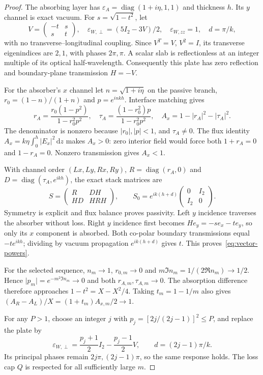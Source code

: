 \documentclass[11pt,a4paper]{article}
\theoremstyle{remark}
\newcommand{\abs}[1]{\lvert #1\rvert}
\newcommand{\dd}{\,\mathrm d}
\newcommand{\diag}{\operatorname{diag}}
\begin{document}
\begin{proof}
The absorbing layer has $\varepsilon_A=\diag(1+i\eta,1,1)$ and thickness $h$. Its $y$ channel is exact vacuum. For $s=\sqrt{1-t^2}$, let
\[
 V=\begin{pmatrix}-t&s\\s&t\end{pmatrix},\quad
 \varepsilon_{W,\perp}=(5I_2-3V)/2,\quad\varepsilon_{W,zz}=1,\quad d=\pi/k,
\]
with no transverse--longitudinal coupling. Since $V^T=V$, $V^2=I$, its transverse eigenindices are $2,1$, with phases $2\pi,\pi$. A scalar slab is reflectionless at an integer multiple of its optical half-wavelength. Consequently this plate has zero reflection and boundary-plane transmission $H=-V$.

For the absorber's $x$ channel let $n=\sqrt{1+i\eta}$ on the passive branch, $r_0=(1-n)/(1+n)$ and $p=e^{inkh}$. Interface matching gives
\[
 r_A=\frac{r_0(1-p^2)}{1-r_0^2p^2},\quad
 \tau_A=\frac{(1-r_0^2)p}{1-r_0^2p^2},\quad
 A_x=1-\abs{r_A}^2-\abs{\tau_A}^2.
\]
The denominator is nonzero because $\abs{r_0},\abs p<1$, and $\tau_A\ne0$. The flux identity $A_x=k\eta\int_0^h\abs{E_x}^2\dd z$ makes $A_x>0$: zero interior field would force both $1+r_A=0$ and $1-r_A=0$. Nonzero transmission gives $A_x<1$.

With channel order $(Lx,Ly,Rx,Ry)$, $R=\diag(r_A,0)$ and $D=\diag(\tau_A,e^{ikh})$, the exact stack matrices are
\[
 S=\begin{pmatrix}R&DH\\HD&HRH\end{pmatrix},\qquad
 S_0=e^{ik(h+d)}\begin{pmatrix}0&I_2\\I_2&0\end{pmatrix}.
\]
Symmetry is explicit and flux balance proves passivity. Left $y$ incidence traverses the absorber without loss. Right $y$ incidence first becomes $He_y=-se_x-te_y$, so only its $x$ component is absorbed. Both co-polar boundary transmissions equal $-te^{ikh}$; dividing by vacuum propagation $e^{ik(h+d)}$ gives $t$. This proves~\eqref{eq:vector-powers}.

For the selected sequence, $n_m\to1$, $r_{0,m}\to0$ and $m\Im n_m=1/(2\Re n_m)\to1/2$. Hence $\abs{p_m}=e^{-m^2\Im n_m}\to0$ and both $r_{A,m},\tau_{A,m}\to0$. The absorption difference therefore approaches $1-t^2=X-X^2/4$. Taking $t_m=1-1/m$ also gives $(A_R-A_L)/X=(1+t_m)A_{x,m}/2\to1$.

For any $P>1$, choose an integer $j$ with $p_j=[2j/(2j-1)]^2\leq P$, and replace the plate by
\[
 \varepsilon_{W,\perp}=\frac{p_j+1}{2}I_2-\frac{p_j-1}{2}V,\qquad
 d=(2j-1)\pi/k.
\]
Its principal phases remain $2j\pi,(2j-1)\pi$, so the same response holds. The loss cap $Q$ is respected for all sufficiently large $m$.
\end{proof}
\end{document}
